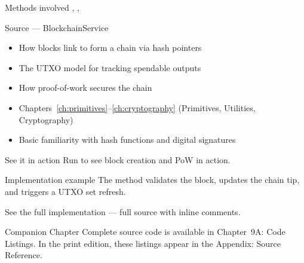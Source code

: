 \begin{infobox}{Methods involved}
,
,
\end{infobox}

\begin{infobox}{Source}
 --- BlockchainService
\end{infobox}

\begin{learnbox}
\begin{itemize}
  \item How blocks link to form a chain via hash pointers
  \item The UTXO model for tracking spendable outputs
  \item How proof-of-work secures the chain
\end{itemize}
\end{learnbox}

\begin{prereqbox}
\begin{itemize}
  \item Chapters~\ref{ch:primitives}--\ref{ch:cryptography} (Primitives, Utilities, Cryptography)
  \item Basic familiarity with hash functions and digital signatures
\end{itemize}
\end{prereqbox}

\begin{examplebox}{See it in action}
Run  to see block creation and
PoW in action.
\end{examplebox}

\begin{examplebox}{Implementation example}
The  method validates the block, updates the
chain tip, and triggers a UTXO set refresh.
\end{examplebox}

\begin{refbox}{See the full implementation}
 ---
full source with inline comments.
\end{refbox}

\begin{refbox}{Companion Chapter}
Complete source code is available in Chapter~9A: Code Listings.
In the print edition, these listings appear in the Appendix:
Source Reference.
\end{refbox}

